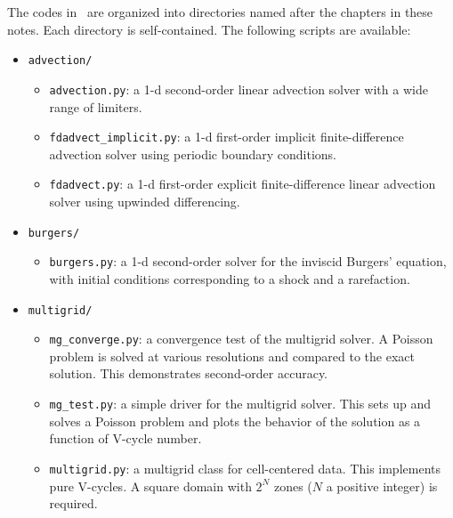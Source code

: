 The codes in \hydroex\ are organized into directories named after the
chapters in these notes.  Each directory is self-contained.  The
following scripts are available:

\begin{itemize}

\item {\tt advection/}
  
  \begin{itemize}
  \item {\tt advection.py}: a 1-d second-order linear advection solver
    with a wide range of limiters.

  \item {\tt fdadvect\_implicit.py}: a 1-d first-order implicit
    finite-difference advection solver using periodic boundary
    conditions.

  \item {\tt fdadvect.py}: a 1-d first-order explicit
    finite-difference linear advection solver using upwinded
    differencing.

  \end{itemize}

\item {\tt burgers/}

  \begin{itemize}
  \item {\tt burgers.py}: a 1-d second-order solver for the inviscid
    Burgers' equation, with initial conditions corresponding to a
    shock and a rarefaction.

  \end{itemize}

\item {\tt multigrid/}

  \begin{itemize}
  \item {\tt mg\_converge.py}: a convergence test of the multigrid
    solver.  A Poisson problem is solved at various resolutions and
    compared to the exact solution.  This demonstrates second-order
    accuracy.

  \item {\tt mg\_test.py}: a simple driver for the multigrid solver.
    This sets up and solves a Poisson problem and plots the behavior 
    of the solution as a function of V-cycle number.

  \item{\tt multigrid.py}: a multigrid class for cell-centered data.
    This implements pure V-cycles.  A square domain with $2^N$ zones
    ($N$ a positive integer) is required.


\end{itemize}
\end{itemize}
